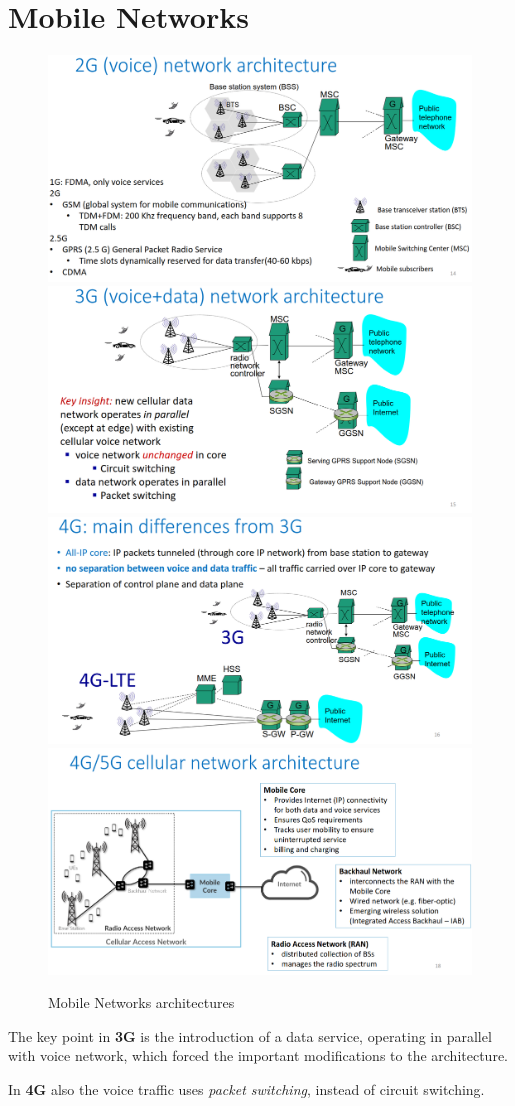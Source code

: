\chapter{Mobile Networks}
\begin{figure}[htbp]
   \centering
   \includegraphics[width=0.45\columnwidth]{images/2g_architecture.png}
   \includegraphics[width=0.45\columnwidth]{images/3g_architecture.png}\\
   \includegraphics[width=0.45\columnwidth]{images/4g_architecture.png}
   \includegraphics[width=0.45\columnwidth]{images/5g_architecture.png}

   \caption{Mobile Networks architectures}
   \label{fig:mobile_architectures}
\end{figure}

The key point in \textbf{3G} is the introduction of a data service, operating in parallel with voice network, which forced the important modifications to the architecture.

In \textbf{4G} also the voice traffic uses \textit{packet switching}, instead of circuit switching.

